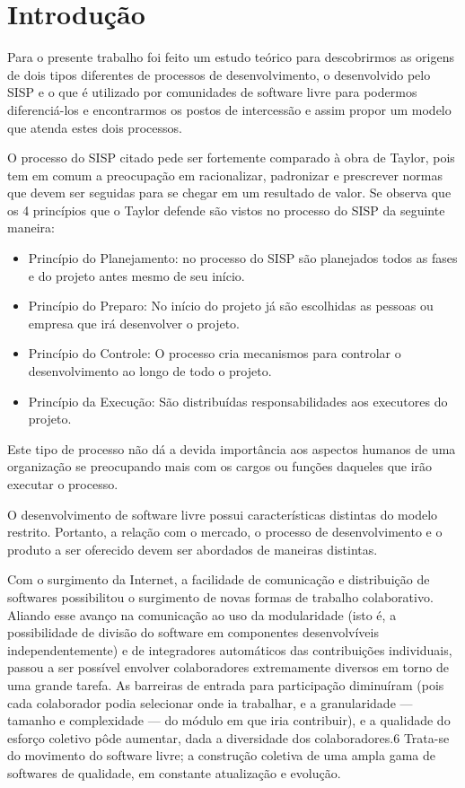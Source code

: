 \chapter*[Introdução]{Introdução}

Para o presente trabalho foi feito um estudo teórico para descobrirmos as origens
de dois tipos diferentes de processos de desenvolvimento, o desenvolvido pelo 
SISP e o que é utilizado por comunidades de software livre para podermos diferenciá-los
e encontrarmos os postos de intercessão e assim propor um modelo que atenda estes dois 
processos.

O processo do SISP citado pede ser fortemente comparado à obra de Taylor, pois 
tem em comum a preocupação em racionalizar, padronizar e prescrever normas que
devem ser seguidas para se chegar em um resultado de valor.
%
Se observa que os 4 princípios que o Taylor defende são vistos no processo do SISP
da seguinte maneira: 
\begin{itemize}
\item Princípio do Planejamento: no processo do SISP são planejados todos as fases
e do projeto antes mesmo de seu início.
\item Princípio do Preparo: No início do projeto já são escolhidas as pessoas 
ou empresa que irá desenvolver o projeto.
\item Princípio do Controle: O processo cria mecanismos para controlar o desenvolvimento
ao longo de todo o projeto.
\item Princípio da Execução: São distribuídas responsabilidades aos executores do projeto. 
\end{itemize}

Este tipo de processo não dá a devida importância aos aspectos humanos de uma organização
se preocupando mais com os cargos ou funções daqueles que irão executar o processo.

O desenvolvimento de software livre possui características distintas do modelo restrito. Portanto,
a relação com o mercado, o processo de desenvolvimento e o produto a ser oferecido devem ser
abordados de maneiras distintas.\cite{meirelles2013metrics}

Com o surgimento da Internet, a facilidade de comunicação e distribuição de 
softwares possibilitou o surgimento de novas formas de trabalho colaborativo.
Aliando esse avanço na comunicação ao uso da modularidade (isto é, a possibilidade 
de divisão do software em componentes desenvolvíveis independentemente) e de 
integradores automáticos das contribuições individuais, passou a ser possível 
envolver colaboradores extremamente diversos em torno de uma grande tarefa. 
As barreiras de entrada para participação diminuíram (pois cada colaborador podia 
selecionar onde ia trabalhar, e a granularidade — tamanho e complexidade — do módulo 
em que iria contribuir), e a qualidade do esforço coletivo pôde aumentar, dada a 
diversidade dos colaboradores.6 Trata-se do movimento do software livre; 
a construção coletiva de uma ampla gama de softwares de qualidade, em constante 
atualização e evolução.\cite{simon2010rossio}

